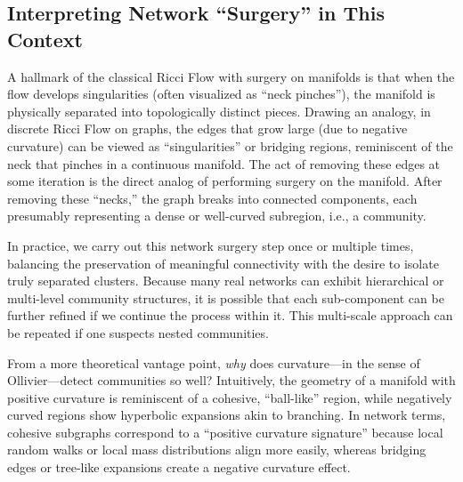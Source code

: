 \subsection{Interpreting Network ``Surgery'' in This Context}
\label{subsec:surgery}

A hallmark of the classical Ricci Flow with surgery on manifolds is that when the flow develops singularities (often visualized as “neck pinches”), the manifold is physically separated into topologically distinct pieces. Drawing an analogy, in discrete Ricci Flow on graphs, the edges that grow large (due to negative curvature) can be viewed as “singularities” or bridging regions, reminiscent of the neck that pinches in a continuous manifold. The act of removing these edges at some iteration is the direct analog of performing surgery on the manifold. After removing these “necks,” the graph breaks into connected components, each presumably representing a dense or well-curved subregion, i.e., a community.

In practice, we carry out this network surgery step once or multiple times, balancing the preservation of meaningful connectivity with the desire to isolate truly separated clusters. Because many real networks can exhibit hierarchical or multi-level community structures, it is possible that each sub-component can be further refined if we continue the process within it. This multi-scale approach can be repeated if one suspects nested communities.

From a more theoretical vantage point, \emph{why} does curvature---in the sense of Ollivier---detect communities so well? Intuitively, the geometry of a manifold with positive curvature is reminiscent of a cohesive, ``ball-like'' region, while negatively curved regions show hyperbolic expansions akin to branching. In network terms, cohesive subgraphs correspond to a “positive curvature signature” because local random walks or local mass distributions align more easily, whereas bridging edges or tree-like expansions create a negative curvature effect. 